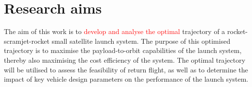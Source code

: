   	   

  	  	
  	  	

  \section{Research aims}

    The aim of this work is to \textcolor{red}{develop and analyse the optimal} trajectory of a rocket-scramjet-rocket small satellite launch system. The purpose of this optimised trajectory is to maximise the payload-to-orbit capabilities of the launch system, thereby also maximising the cost efficiency of the system. The optimal trajectory will be utilised to assess the feasibility of return flight, as well as to determine the impact of key vehicle design parameters on the performance of the launch system. 
 
